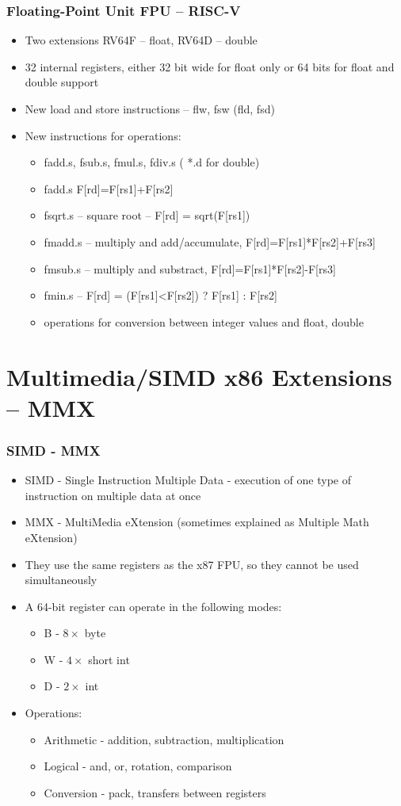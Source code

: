 \documentclass{beamer}
\begin{document}
\begin{frame}
\frametitle{Floating-Point Unit FPU -- RISC-V}
\begin{itemize}
\item Two extensions RV64F -- float, RV64D -- double
\item 32 internal registers, either 32 bit wide for float only or 64 bits for float and double support
\item New load and store instructions -- flw, fsw (fld, fsd)
\item New instructions for operations:
\begin{itemize}
\item fadd.s, fsub.s, fmul.s, fdiv.s ( *.d for double)
\item fadd.s   F[rd]=F[rs1]+F[rs2] 
\item fsqrt.s -- square root -- F[rd] = sqrt(F[rs1])
\item fmadd.s -- multiply and add/accumulate, F[rd]=F[rs1]*F[rs2]+F[rs3]
\item fmsub.s -- multiply and substract, F[rd]=F[rs1]*F[rs2]-F[rs3]
\item fmin.s -- F[rd] = (F[rs1]<F[rs2]) ? F[rs1] : F[rs2]
\item operations for conversion between integer values and float, double
\end{itemize}
\end{itemize}
\end{frame}

\section{Multimedia/SIMD x86 Extensions -- MMX}


\begin{frame}
\frametitle{SIMD - MMX}

\begin{itemize}
\item SIMD - Single Instruction Multiple Data - execution of one type of instruction on multiple data at once
\item MMX - MultiMedia eXtension (sometimes explained as Multiple Math eXtension)
\item They use the same registers as the x87 FPU, so they cannot be used simultaneously
\item A 64-bit register can operate in the following modes:
\begin{itemize}
\item B - $8\times$ byte
\item W - $4\times$ short int
\item D - $2\times$ int
\end{itemize}
\item Operations:
\begin{itemize}
\item Arithmetic - addition, subtraction, multiplication
\item Logical - and, or, rotation, comparison
\item Conversion - pack, transfers between registers
\end{itemize}
\end{itemize}
\end{frame}
\end{document}
